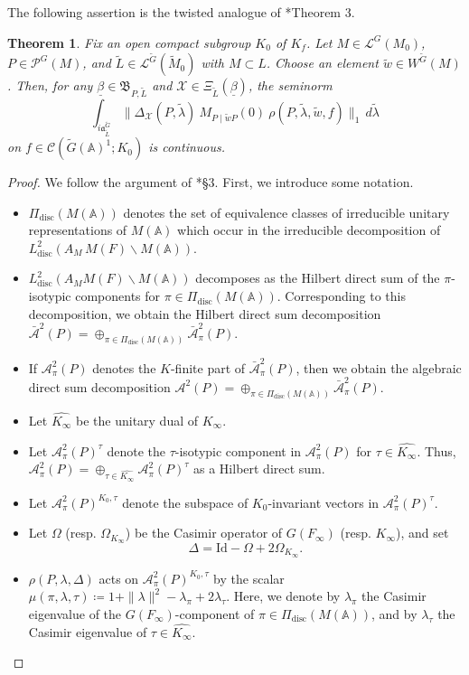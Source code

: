\documentclass[12pt]{amsart}
\theoremstyle{definition}
\theoremstyle{plain}
\newtheorem{theorem}[definition]{Theorem}
\theoremstyle{remark}
\def\A{\mathbb{A}}%
\def\inf{\infty}
\def\bs{\backslash}%
\newcommand{\fa}{\mathfrak{a}}
\newcommand{\fB}{\mathfrak{B}}
\newcommand{\cA}{\mathcal{A}}
\newcommand{\cC}{\mathcal{C}}
\newcommand{\cL}{\mathcal{L}}
\newcommand{\cP}{\mathcal{P}}
\newcommand{\cX}{\mathcal{X}}
\numberwithin{equation}{section}
\newcommand{\disc}{\mathrm{disc}}
\newcommand{\tG}{\widetilde{G}}
\newcommand{\tM}{\widetilde{M}}
\newcommand{\tL}{\widetilde{L}}
\newcommand{\tlambda}{\widetilde{\lambda}}
\newcommand{\tw}{\widetilde{w}}
\begin{document}
The following assertion is the twisted analogue of \cite{FLM11}*{Theorem 3}.
\begin{theorem}\label{thm:abs}
    Fix an open compact subgroup $K_0$ of $K_f$.
    Let $M\in\cL^G(M_0)$, $P\in\cP^G(M)$, and $\tL\in\cL^{\tG}(\tM_0)$ with $M\subset L$.
    Choose an element $\tw\in W^{\tG}(M)$.
    Then, for any $\underline{\beta}\in \fB_{P,\tL}$ and $\cX\in \Xi_{\tL}(\underline{\beta})$, 
    the seminorm 
    \[
    \int_{i\fa_{\tL}^{\tG}} \|\Delta_{\cX}(P,\tlambda) \ M_{P\mid \tw P}(0) \ \rho(P,\tlambda,\tw,f)  \|_1\, d\tlambda
    \]
    on $f\in \cC(\tG(\A)^1;K_0)$ is continuous.
\end{theorem}
\begin{proof}
We follow the argument of \cite{FLM11}*{\S3}.
First, we introduce some notation.
\begin{itemize}
    \item $\Pi_\disc(M(\A))$ denotes the set of equivalence classes of irreducible unitary representations of $M(\A)$ which occur in the irreducible decomposition of $L^2_\disc(A_M\, M(F)\bs M(\A))$.
    \item $L^2_\disc(A_M M(F)\bs M(\A))$ decomposes as the Hilbert direct sum of the $\pi$-isotypic components for $\pi\in\Pi_\disc(M(\A))$. Corresponding to this decomposition, we obtain the Hilbert direct sum decomposition $\bar{\cA}^2(P)=\oplus_{\pi\in\Pi_{\disc}(M(\A))} \bar{\cA}_\pi^2(P)$.
    \item If $\cA^2_\pi(P)$ denotes the $K$-finite part of $\bar{\cA}_\pi^2(P)$, then we obtain the algebraic direct sum decomposition $\cA^2(P)=\oplus_{\pi\in\Pi_{\disc}(M(\A))} \bar{\cA}_\pi^2(P)$.
    \item Let $\widehat{K_\inf}$ be the unitary dual of $K_\inf$.
    \item Let $\cA^2_\pi(P)^\tau$ denote the $\tau$-isotypic component in $\cA^2_\pi(P)$ for $\tau\in\widehat{K_\inf}$. Thus, $\cA^2_\pi(P)=\oplus_{\tau\in\widehat{K_\inf}}\cA^2_\pi(P)^\tau$ as a Hilbert direct sum.
    \item Let $\cA^2_\pi(P)^{K_0,\tau}$ denote the subspace of $K_0$-invariant vectors in $\cA^2_\pi(P)^{\tau}$.
    \item Let $\Omega$ (resp. $\Omega_{K_\inf}$) be the Casimir operator of $G(F_\inf)$ (resp. $K_\inf$), and set
    \[
    \Delta=\mathrm{Id}-\Omega+2\Omega_{K_\inf}.
    \]
    \item $\rho(P,\lambda,\Delta)$ acts on $\cA^2_\pi(P)^{K_0,\tau}$ by the scalar $\mu(\pi,\lambda,\tau)\coloneqq 1+\|\lambda\|^2-\lambda_\pi+2\lambda_\tau$. Here, we denote by $\lambda_\pi$ the Casimir eigenvalue of the $G(F_\inf)$-component of $\pi\in\Pi_\disc(M(\A))$, and by $\lambda_\tau$ the Casimir eigenvalue of $\tau\in \widehat{K_\inf}$.

\end{itemize}
\end{proof}
\end{document}
